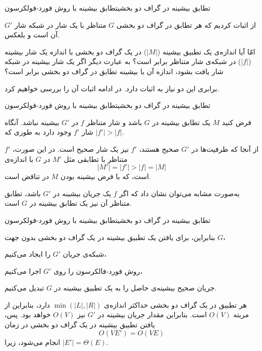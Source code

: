 \begin{itemframe-s}{تطابق بیشینه در گراف دو بخشی}{تطابق بیشینه با روش فورد-فولکرسون}
\item[-]
از اثبات کردیم که هر تطابق در گراف دو بخشی $G$ متناظر با یک شار در شبکه شار $G'$ آن است و بلعکس.
\item[-]
امّا آیا اندازه‌ی یک تطبیق بیشینه ($|M|$) در یک گراف دو بخشی با اندازه یک شار بیشینه ($|f|$) در شبکه‌ی شار متناظر برابر است؟ به عبارت دیگر اگر یک شار بیشینه در شبکه شار یافت بشود، اندازه آن با بیشینه تطابق در گراف دو بخشی برابر است؟
\item[-]
برابری این دو نیاز به اثبات دارد. در ادامه اثبات آن را بررسی خواهیم کرد.
\end{itemframe-s}

\begin{itemframe-s}{تطابق بیشینه در گراف دو بخشی}{تطابق بیشینه با روش فورد-فولکرسون}
\item[-]
 فرض کنید $M$ یک تطابق بیشینه در $G$ باشد و شار متناظر $f$ در $G'$ بیشینه نباشد. آنگاه شار $f'$ وجود دارد به طوری که $|f'| > |f|$.
\item[-]
از آنجا که ظرفیت‌ها در $G'$ صحیح هستند، $f'$ نیز یک شار صحیح است.
در این صورت، $f'$ متناظر با تطابقی مثل $M'$ در $G$ با اندازه‌ی
$$|M'| = |f'| > |f| = |M|$$
است، که با فرض بیشینه بودن $M$ در تناقض است.
\item[-]
به‌صورت مشابه می‌توان نشان داد که اگر $f$ یک جریان بیشینه در $G'$ باشد، تطابق متناظر آن نیز یک تطابق بیشینه در $G$ است.
\end{itemframe-s}


\begin{itemframe-s}{تطابق بیشینه در گراف دو بخشی}{تطابق بیشینه با روش فورد-فولکرسون}
\item[-]
بنابراین، برای یافتن یک تطبیق بیشینه در یک گراف دو بخشی بدون جهت $G$،
\item[1]
 شبکه‌ی جریان $G'$ را ایجاد می‌کنیم،
\item[2]
روش فورد-فالکرسون را روی $G'$ اجرا می‌کنیم،
\item[3]
 جریان صحیح بیشینه‌ی حاصل را به یک تطبیق بیشینه در $G$ تبدیل می‌کنیم.
\item[-]
هر تطبیق در یک گراف دو بخشی حداکثر اندازه‌ی
 $\min({|L|, |R|}) $
دارد، بنابراین از مربته
$O(V)$
است.
بنابراین مقدار جریان بیشینه در $G'$ نیز $O(V)$ خواهد بود. پس، یافتن تطبیق بیشینه در یک گراف دو بخشی در زمان
$$O(VE') = O(VE)$$
انجام می‌شود، زیرا
 $|E'| = \Theta(E)$.
\end{itemframe-s}